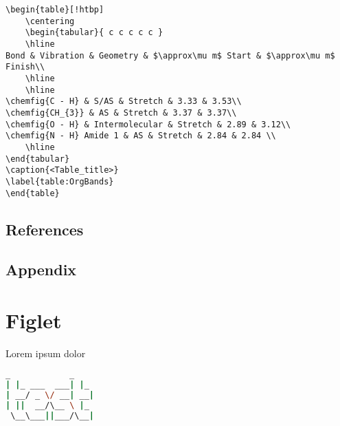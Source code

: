 \documentclass[12pt,a4paper]{article}
\begin{document}
\begin{lstlisting}
\begin{table}[!htbp]
	\centering
	\begin{tabular}{ c c c c c }
	\hline
Bond & Vibration & Geometry & $\approx\mu m$ Start & $\approx\mu m$ Finish\\
 	\hline
 	\hline
\chemfig{C - H} & S/AS & Stretch & 3.33 & 3.53\\
\chemfig{CH_{3}} & AS & Stretch & 3.37 & 3.37\\
\chemfig{O - H} & Intermolecular & Stretch & 2.89 & 3.12\\
\chemfig{N - H} Amide 1 & AS & Stretch & 2.84 & 2.84 \\
	\hline
\end{tabular}
\caption{<Table_title>}
\label{table:OrgBands}
\end{table}
\end{lstlisting}


\subsection{References}

\subsection{Appendix}

\section{Figlet}
Lorem ipsum dolor
\begin{center}
\begin{lstlisting}[language=Bash]
 _            _   
| |_ ___  ___| |_ 
| __/ _ \/ __| __|
| ||  __/\__ \ |_ 
 \__\___||___/\__|
                  
\end{lstlisting}
\end{center}
\end{document}
